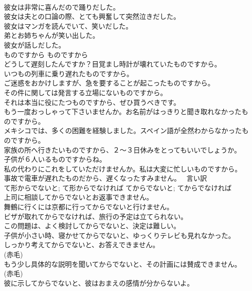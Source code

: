 \documentclass[8pt]{extreport}
\begin{document}
\begin{CJK}{UTF8}{min}
\\	彼女は非常に喜んだので踊りだした。   
\\	彼女は夫との口論の際、とても興奮して突然泣きだした。  
\\	彼女はマンガを読んでいて、笑いだした。  
\\	弟とお姉ちゃんが笑い出した。  
\\	彼女が話しだした。  
\\	ものですから	ものですから	
\\	どうして遅刻したんですか？目覚まし時計が壊れていたものですから。  
\\	いつもの列車に乗り遅れたものですから。   
\\	ご迷惑をおかけしますが、急を要することが起こったものですから。   
\\	その件に関しては発言する立場にないものですから。   
\\	それは本当に役にたつものですから、ぜひ買うべきです。   
\\	もう一度おっしゃって下さいませんか。お名前がはっきりと聞き取れなかったものですから。   
\\	メキシコでは、多くの困難を経験しました。スペイン語が全然わからなかったものですから。   
\\	家族の所へ行きたいものですから、２〜３日休みをとってもいいでしょうか。   
\\	子供が６人いるものですからね。   
\\	私の代わりにこれをしていただけませんか。私は大変に忙しいものですから。  
\\	事故で電車が遅れたものだから、遅くなったすみません。  言い訳 
\\	て形からでないと; て形からでなければ	てからでないと; てからでなければ	
\\	上司に相談してからでないとお返事できません。   
\\	舞鶴に行くには京都に行ってからでないと行けません。  
\\	ビザが取れてからでなければ、旅行の予定は立てられない。  
\\	この問題は、よく検討してからでないと、決定は難しい。  
\\	子供が小さい時、寝かせてからでないと、ゆっくりテレビも見れなかった。  
\\	しっかり考えてからでないと、お答えできません。  
\\	(赤毛)
\\	もう少し具体的な説明を聞いてからでないと、その計画には賛成できません。  
\\	(赤毛)
\\	彼に示してからでないと、彼はおまえの感情が分からないよ。  

\end{CJK}
\end{document}
